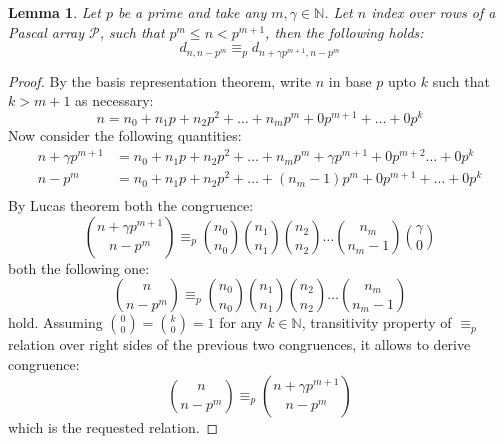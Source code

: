 \documentclass[11pt,a4paper]{article} %
\newtheorem{lemma}[theorem]{Lemma}
\begin{document}
    \begin{lemma}
        Let $p$ be a prime and take any $m, \gamma \in \mathbb{N}$. Let $n$ index
        over rows of a Pascal array $\mathcal{P}$, such that $p^{m} \leq n < p^{m+1}$, then the following holds:
        \begin{displaymath}
            d_{n,n-p^{m}} \equiv_{p} d_{n+\gamma p^{m+1}, n-p^{m}}
        \end{displaymath}
    \end{lemma}
    \begin{proof} %
        By the basis representation theorem, write $n$  in base $p$ upto $k$ such that $k > m+1$ as necessary:
        \begin{displaymath}
            n = n_{0} + n_{1}p + n_{2}p^2 + \ldots + n_{m}p^m + 0p^{m+1} + \ldots + 0p^k
        \end{displaymath}
        Now consider the following quantities:
        \begin{displaymath}
            \begin{split}
                n +\gamma p^{m+1} &= n_{0} + n_{1}p + n_{2}p^2 + \ldots + n_{m}p^m + \gamma p^{m+1} + 0p^{m+2} \ldots + 0p^k \\
                n - p^{m} &= n_{0} + n_{1}p + n_{2}p^2 + \ldots + (n_{m}-1)p^m + 0p^{m+1} + \ldots + 0p^k \\
            \end{split}
        \end{displaymath}
        By Lucas theorem both the congruence:
        \begin{displaymath}
            {{n+\gamma p^{m+1}} \choose { n - p^{m}}} \equiv_{p} 
                {{n_{0}} \choose {n_{0}}}  
                {{n_{1}} \choose {n_{1}}} 
                {{n_{2}} \choose {n_{2}}}
                \ldots
                {{n_{m}} \choose {n_{m}-1}} 
                {{\gamma} \choose {0}} 
        \end{displaymath}
        both the following one:
        \begin{displaymath}
            {{n} \choose { n - p^{m}}} \equiv_{p} 
                {{n_{0}} \choose {n_{0}}}  
                {{n_{1}} \choose {n_{1}}} 
                {{n_{2}} \choose {n_{2}}}
                \ldots
                {{n_{m}} \choose {n_{m}-1}} 
        \end{displaymath}
        hold. Assuming ${{0}\choose{0}} = {{k}\choose{0}} = 1$ for any $k\in\mathbb{N}$, 
        transitivity property of $\equiv_p$ relation over right sides of
        the previous two congruences, it allows to derive congruence:
        \begin{displaymath}
            {{n} \choose { n - p^{m}}} \equiv_{p} {{n+\gamma p^{m+1}} \choose { n - p^{m}}} 
        \end{displaymath}
        which is the requested relation.
    \end{proof}
\end{document}
